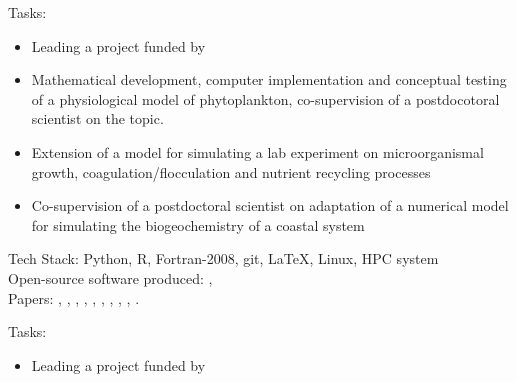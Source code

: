\documentclass[
	a4paper,
]{fortysecondscv}
\begin{document}
\begin{cvtable}[1.5]
	{\href{https://uol.de/en/icbm}{\color{pblue}{ICBM, University of Oldenburg, Germany}}}
	{Tasks:
	\small{\begin{itemize}[leftmargin=*]
     \item Leading a project funded by \href{https://www.dfg.de/en}{\color{blue}{DFG}}
     \item Mathematical development, computer implementation and conceptual testing of a physiological model of phytoplankton, co-supervision of a postdocotoral scientist on the topic.%
     \item Extension of a model for simulating a lab experiment on microorganismal growth, coagulation/flocculation and nutrient recycling processes  %
     \item Co-supervision of a postdoctoral scientist on adaptation of a numerical model for simulating the biogeochemistry of a coastal system
    \end{itemize}}
      Tech Stack: Python, R, Fortran-2008, git, \LaTeX, Linux, HPC system\\  
      Open-source software produced: 
      \href{https://github.com/OnurKerimoglu/fabm-nflexpd}{\color{pblue}{FABM-NflexPD}}, 
      \href{https://github.com/OnurKerimoglu/R-EcoMol}{\color{pblue}{R-EcoMol}}\\
      Papers:
      \href{https://doi.org/10.1016/j.ecolmodel.2020.109401}{\color{pblue}{1}}, 
      \href{https://doi.org/10.1111/ele.13680}{\color{pblue}{2}}, 
      \href{https://doi.org/10.5194/gmd-14-6025-2021}{\color{pblue}{3}}, 
      \href{https://doi.org/10.3389/fmars.2021.675428}{\color{pblue}{4}}, 
      \href{https://doi.org/10.1002/lno.12005}{\color{pblue}{5}}, 
      \href{https://doi.org/10.3389/fmars.2022.975414}{\color{pblue}{6}}, 
      \href{https://doi.org/10.1016/j.scitotenv.2022.158757}{\color{pblue}{7}},
      \href{https://ospar.org/documents?v=48846}{\color{pblue}{8}}, 
      \href{https://doi.org/10.5194/egusphere-2022-493}{\color{pblue}{9}}, 
      \href{https://doi.org/10.1101/2022.05.18.492269}{\color{pblue}{10}}.
    }
	{\href{https://www.hereon.de/}{\color{pblue}{Helmholtz-Zentrum Hereon, Germany}}}
	{Tasks:
	\small{\begin{itemize}[leftmargin=*]
     \item Leading a project funded by \href{https://www.umweltbundesamt.de/en}{\color{blue}{UBA}}

\end{itemize}}}
\end{cvtable}
\end{document}
